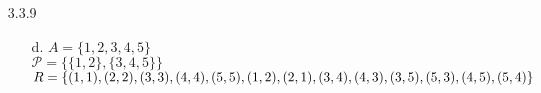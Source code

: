 \documentclass[11pt]{amsart}
\theoremstyle{definition}
\begin{document}
\begin{itemize}
\begin{itemize}
\end{itemize}

\item[3.3.9]
\begin{itemize}
    \item[d.] $A=\{1,2,3,4,5\}$ \\
              $\mathscr{P}=\{\{1,2\},\{3,4,5\}\}$ \\
              $R=\{(1,1),(2,2),(3,3),(4,4),(5,5),\\(1,2),(2,1),(3,4),(4,3),(3,5),(5,3),(4,5),(5,4)\}$
    
\end{itemize}

\end{itemize}
\end{document}
